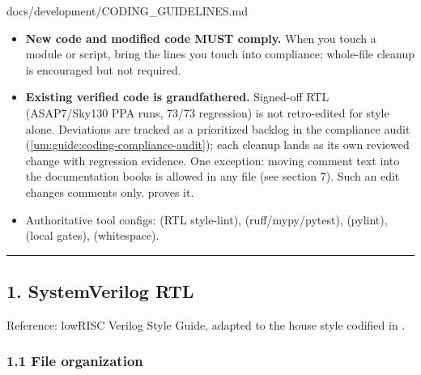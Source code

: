 \begin{relocated}{docs/development/CODING_GUIDELINES.md}
\begin{itemize}
\tightlist
\item
  \textbf{New code and modified code MUST comply.} When you touch a
  module or script, bring the lines you touch into compliance;
  whole-file cleanup is encouraged but not required.
\item
  \textbf{Existing verified code is grandfathered.} Signed-off RTL
  (ASAP7/\allowbreak{}Sky130 PPA runs,  73/73 regression)
  is not retro-edited for style alone. Deviations are tracked as a
  prioritized backlog in the compliance
  audit (\cref{um:guide:coding-compliance-audit}); each cleanup lands as
  its own reviewed change with regression evidence. One exception:
  moving comment text into the documentation books is allowed in any
  file (see section 7). Such an edit changes comments only.
   proves it.
\item
  Authoritative tool configs:  (RTL
  style-lint), 
  (ruff/\allowbreak{}mypy/\allowbreak{}pytest), 
  (pylint),  (local gates),
   (whitespace).
\end{itemize}

\begin{center}\rule{0.5\linewidth}{0.5pt}\end{center}

\subsection{1. SystemVerilog RTL}\label{um:guide:coding-guidelines:1-systemverilog-rtl}

Reference: lowRISC Verilog Style Guide, adapted to the house style
codified in .

\subsubsection{1.1 File organization}\label{um:guide:coding-guidelines:11-file-organization}

{\small\setlength{\tabcolsep}{4pt}

}
\end{relocated}
